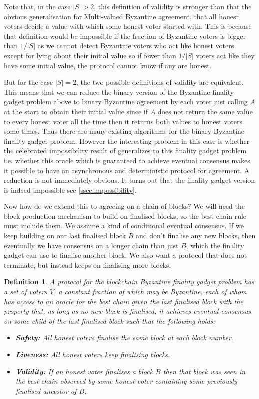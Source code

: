 \documentclass{article}
\newtheorem{definition}[theorem]{Definition}
\begin{document}
Note that, in the case $|S| > 2$, this definition of validity is stronger than that the obvious generalisation for Multi-valued Byzantine agreement, that all honest voters decide a value with which some honest voter started with.
This is because that definition would be impossible if the fraction of Byzantine voters is bigger than $1/|S|$ as we cannot detect Byzantine voters who act like honest voters except for lying about their initial value so if fewer than $1/|S|$ voters act like they have some initial value, the protocol cannot know if any are honest. 

But for the case $|S|=2$, the two possible definitions of validity are equivalent. This means that we can reduce the binary version of the Byzantine finality gadget problem above to binary Byzantine agreement by each voter just calling $A$ at the start to obtain their initial value since if $A$ does not return the same value to every honest voter all the time then it returns both values to honest voters some times. Thus there are many existing algorithms for the binary Byzantine finality gadget problem. However the interesting problem in this case is whether the celebrated impossibility result of \cite{flp} generalizes to this finality gadget problem i.e. whether this oracle which is guaranteed to achieve eventual consensus makes it possible to have an asynchronous and deterministic protocol for agreement. A reduction is not immediately obvious. It turns out that the finality gadget version is indeed impossible see \ref{ssec:impossibility}.

Now how do we extend this to agreeing on a chain of blocks? We will need the block production mechanism to build on finalised blocks, so the best chain rule must include them. We assume a kind of conditional eventual consensus. If we keep building on our last finalised block $B$ and don't finalise any new blocks, then eventually we have consensus on a longer chain than just $B$, which the finality gadget can use to finalise another block. We also want a protocol that does not terminate, but instead keeps on finalising more blocks. 

\begin{definition} A protocol for the blockchain Byzantine finality gadget problem has a set of voters $V$, a constant fraction of which may be Byzantine, each of whom has access to an oracle for the best chain given the last finalised block with the property that, as long as no new block is finalised, it achieves eventual consensus on some child of the last finalised block  such that the following holds:

\begin{itemize}
\item{\bf Safety:} All honest voters finalise the same block at each block number.
\item{\bf Liveness:} All honest voters keep finalising blocks.
\item{\bf Validity:} If an honest voter finalises a block $B$ then that block was seen in the best chain observed by some honest voter containing some previously finalised ancestor of $B$,
\end{itemize}

\end{definition}
\end{document}
